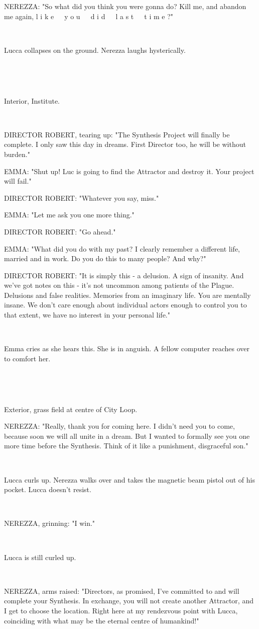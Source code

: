 \documentclass[11pt]{article}
\begin{document}
NEREZZA: "So what did you think you were gonna do?
Kill me, and abandon me again, 
l i k e\ \ \ y o u\ \ \ d i d\ \ \ l a s t\ \ \ t i m e ?"

\ 

Lucca collapses on the ground. 
Nerezza laughs hysterically.

\ 

\ 

Interior, Institute.

\ 

DIRECTOR ROBERT, tearing up: "The Synthesis Project will finally be complete.
I only saw this day in dreams.
First Director too, he will be without burden."

EMMA: "Shut up! Luc is going to find the Attractor and destroy it.
Your project will fail."

DIRECTOR ROBERT: "Whatever you say, miss."

EMMA: "Let me ask you one more thing."

DIRECTOR ROBERT: "Go ahead."

EMMA: "What did you do with my past?
I clearly remember a different life, married and in work.
Do you do this to many people?
And why?"

DIRECTOR ROBERT: "It is simply this - a delusion.
A sign of insanity.
And we've got notes on this - it's not uncommon among patients of the Plague.
Delusions and false realities.
Memories from an imaginary life.
You are mentally insane.
We don't care enough about individual actors enough to control you to that extent, we have no interest in your personal life."

\ 

Emma cries as she hears this. 
She is in anguish.
A fellow computer reaches over to comfort her.

\ 

\ 

Exterior, grass field at centre of City Loop.

NEREZZA: "Really, thank you for coming here.
I didn't need you to come, because soon we will all unite in a dream. 
But I wanted to formally see you one more time before the Synthesis.
Think of it like a punishment, disgraceful son."

\ 

Lucca curls up.
Nerezza walks over and takes the magnetic beam pistol out of his pocket.
Lucca doesn't resist.

\ 

NEREZZA, grinning: "I win."

\ 

Lucca is still curled up.

\ 

NEREZZA, arms raised: "Directors, as promised, I've committed to and will complete your Synthesis.
In exchange, you will not create another Attractor, and I get to choose the location.
Right here at my rendezvous point with Lucca, coinciding with what may be the eternal centre of humankind!"
\end{document}
